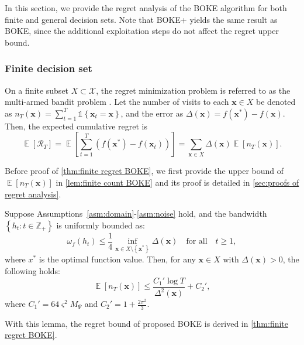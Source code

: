 \documentclass[11pt,en]{elegantpaper}
\newcommand{\domain}{\mathcal{X}}
\newcommand{\x}{\bm{x}}
\newcommand{\cumregret}{\mathcal{R}}
\newcommand{\1}{\mathds{1}}
\newcommand{\set}[1]{\left\{#1\right\}}
\DeclareMathOperator*{\E}{\mathbb{E}}
\begin{document}
In this section, we provide the regret analysis of the BOKE algorithm for both finite and general decision sets. Note that BOKE+ yields the same result as BOKE, since the additional exploitation steps do not affect the regret upper bound.




\subsubsection{Finite decision set}

On a finite subset $X \subset \domain$, the regret minimization problem is referred to as the multi-armed bandit problem \cite{auer2002finite}.
Let the number of visits to each $\x \in X$ be denoted as $n_T(\x) = \sum_{t=1}^{T} \1\set{\x_t = \x}$, and the error as $\Delta(\x) = f(\x^{\ast}) - f(\x)$.
Then, the expected cumulative regret is
\begin{equation}
    \label{eqn:expected cumulative regret}
    \E[\cumregret_T] = \E [\sum_{t=1}^{T} (f(\x^{\ast}) - f(\x_t))] = \sum_{\x \in X} \Delta(\x) \E[n_T(\x)].
\end{equation}


Before proof of \cref{thm:finite regret BOKE}, we first provide the upper bound of $\E[n_T(\x)]$ in \cref{lem:finite count BOKE} and its proof is detailed in \cref{sec:proofs of regret analysis}.
\begin{lemma}
    \label{lem:finite count BOKE}
    Suppose Assumptions~\ref{asm:domain}-\ref{asm:noise} hold, and the bandwidth $\set{h_t : t \in \mathbb{Z}_+}$ is uniformly bounded as:
    \begin{equation}
        \omega_f(h_t)
        \le \dfrac{1}{4} \inf_{\x \in X \setminus \set{\x^{\ast}}} \Delta(\x)
        \quad \text{for all} \quad t \ge 1,
    \end{equation}
    where $x^\ast$ is the optimal function value. Then, for any $\x \in X$ with $\Delta(\x) > 0$, the following holds:
    \begin{equation}
        \E[n_T(\x)] \le \dfrac{C_1' \log T}{\Delta^2(\x)} + C_2',
    \end{equation}
    where $C_1' = 64 \varsigma^2 M_{\Psi}$ and $C_2' = 1 + \frac{2 \pi^2}{3}$.
\end{lemma}


With this lemma, the regret bound of proposed BOKE is derived in \cref{thm:finite regret BOKE}.
\end{document}
